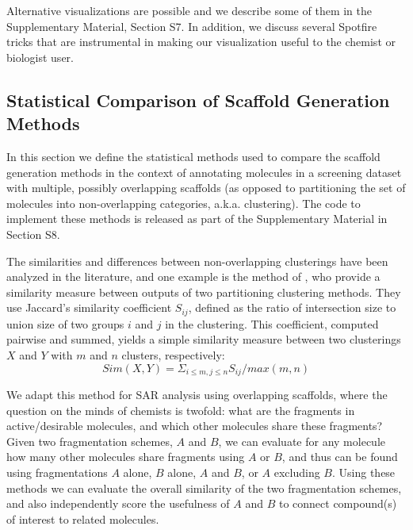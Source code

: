 \documentclass[journal=jacsat,manuscript=article]{achemso}
\begin{document}
Alternative visualizations are possible and we describe some of them
in the Supplementary Material, Section S7. In addition, we discuss several
Spotfire tricks that are instrumental in making our visualization
useful to the chemist or biologist
user. %

\subsection{Statistical Comparison of Scaffold Generation Methods}
\label{sec:statmethod}
In this section we define the statistical methods used to compare the
scaffold generation methods in the context of annotating molecules in
a screening dataset with multiple, possibly overlapping scaffolds (as
opposed to partitioning the set of molecules into non-overlapping
categories, a.k.a. clustering). The code to implement these methods is released
as part of the Supplementary Material in Section S8.

The similarities and differences between non-overlapping clusterings
have been analyzed in the literature, and one example is the method of
\citeauthor{Torres2009}, who provide a similarity measure between
outputs of two partitioning clustering methods. They use Jaccard's
similarity coefficient $S_{ij}$, defined as the ratio of intersection
size to union size of two groups $i$ and $j$ in the clustering.  This
coefficient, computed pairwise and summed, yields a simple similarity
measure between two clusterings $X$ and $Y$ with $m$ and $n$ clusters,
respectively:
\begin{equation}
Sim(X,Y) = \Sigma_{i \le m, j \le n}{S_{ij} / max(m,n)}
\end{equation}

We adapt this method for SAR analysis using overlapping scaffolds,
where the question on the minds of chemists is twofold: what are the
fragments in active/desirable molecules, and which other molecules
share these fragments? Given two fragmentation schemes, $A$ and $B$,
we can evaluate for any molecule how many other molecules share
fragments using $A$ or $B$, and thus can be found using fragmentations
$A$ alone, $B$ alone, $A$ and $B$, or $A$ excluding $B$.  Using these
methods we can evaluate the overall similarity of the two
fragmentation schemes, and also independently score the usefulness of
$A$ and $B$ to connect compound(s) of interest to related molecules. 
\end{document}
